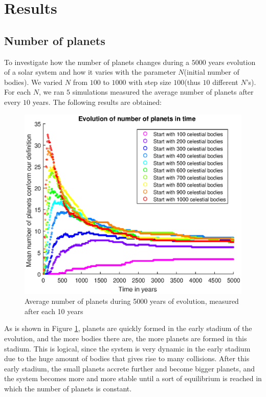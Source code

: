 \section{Results}

\subsection{Number of planets}
To investigate how the number of planets changes during a $5000$ years evolution of a solar system and how it varies with the parameter $N$(initial number of bodies). 
We varied $N$ from $100$ to $1000$ with step size $100$(thus $10$ different $N$'s). 
For each $N$, we ran $5$ simulations measured the average number of planets after every $10$ years. The following results are obtained:

\begin{figure}[H]
\centering
\includegraphics[scale=0.8]{AantPlaneten.eps}
\caption{Average number of planets during 5000 years of evolution, measured after each 10 years}
    \label{fig:AantPlaneten}
\end{figure}

As is shown in Figure \ref{fig:AantPlaneten}, planets are quickly formed in the early stadium of the evolution, and the more bodies there are, the more planets are formed in this stadium. 
This is logical, since the system is very dynamic in the early stadium due to the huge amount of bodies that gives rise to many collisions. 
After this early stadium, the small planets accrete further and become bigger planets, and the system becomes more and more stable until a sort of equilibrium is reached in which the number of planets is constant.\\


